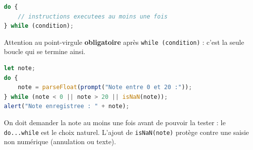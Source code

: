 \documentclass[11pt]{article}
\begin{document}
\begin{propriete}
\begin{lstlisting}[language=JavaScript]
do {
    // instructions executees au moins une fois
} while (condition);
\end{lstlisting}
Attention au point-virgule \textbf{obligatoire} après \texttt{while (condition)} : c'est la seule boucle qui se termine ainsi.
\end{propriete}

\begin{exemplebox}
\begin{lstlisting}[language=JavaScript]
let note;
do {
    note = parseFloat(prompt("Note entre 0 et 20 :"));
} while (note < 0 || note > 20 || isNaN(note));
alert("Note enregistree : " + note);
\end{lstlisting}
On doit demander la note au moins une fois avant de pouvoir la tester : le \texttt{do...while} est le choix naturel. L'ajout de \texttt{isNaN(note)} protège contre une saisie non numérique (annulation ou texte).
\end{exemplebox}
\end{document}
